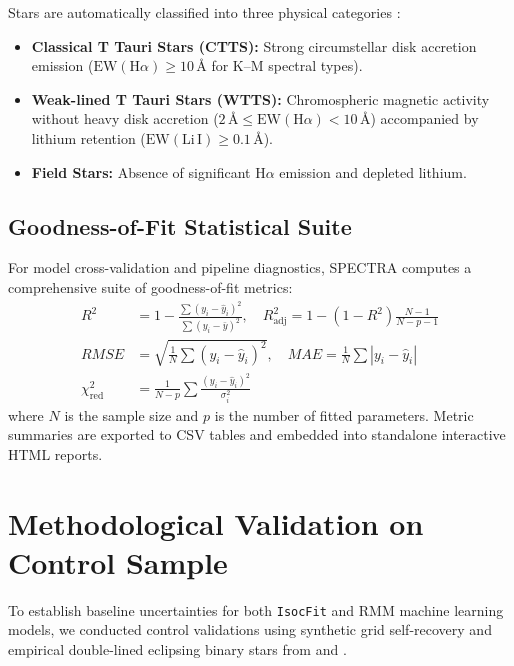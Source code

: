 \documentclass[fleqn,usenatbib]{mnras}
\begin{document}
Stars are automatically classified into three physical categories \citep{herczeg2015empirical}:
\begin{itemize}
    \item \textbf{Classical T Tauri Stars (CTTS):} Strong circumstellar disk accretion emission ($\text{EW}(\text{H}\alpha) \ge 10\,\text{\AA}$ for K--M spectral types).
    \item \textbf{Weak-lined T Tauri Stars (WTTS):} Chromospheric magnetic activity without heavy disk accretion ($2\,\text{\AA} \le \text{EW}(\text{H}\alpha) < 10\,\text{\AA}$) accompanied by lithium retention ($\text{EW}(\text{Li}\,\text{I}) \ge 0.1\,\text{\AA}$).
    \item \textbf{Field Stars:} Absence of significant $\text{H}\alpha$ emission and depleted lithium.
\end{itemize}


\subsection{Goodness-of-Fit Statistical Suite}
\label{sec:gof}

For model cross-validation and pipeline diagnostics, \textsc{SPECTRA} computes a comprehensive suite of goodness-of-fit metrics:
\begin{align}
    R^2 &= 1 - \frac{\sum (y_i - \hat{y}_i)^2}{\sum (y_i - \bar{y})^2}, \quad R^2_{\text{adj}} = 1 - (1 - R^2)\frac{N - 1}{N - p - 1} \label{eq:r2} \\
    RMSE &= \sqrt{\frac{1}{N}\sum (y_i - \hat{y}_i)^2}, \quad MAE = \frac{1}{N}\sum |y_i - \hat{y}_i| \label{eq:rmse} \\
    \chi^2_{\text{red}} &= \frac{1}{N - p}\sum \frac{(y_i - \hat{y}_i)^2}{\sigma_i^2} \label{eq:chi2}
\end{align}
where $N$ is the sample size and $p$ is the number of fitted parameters. Metric summaries are exported to CSV tables and embedded into standalone interactive HTML reports.


\section{Methodological Validation on Control Sample}
\label{sec:validation}

To establish baseline uncertainties for both \texttt{IsocFit} and RMM machine learning models, we conducted control validations using synthetic grid self-recovery and empirical double-lined eclipsing binary stars from \citet{delfosse2000accurate} and \citet{benedict2016solar}.
\end{document}
